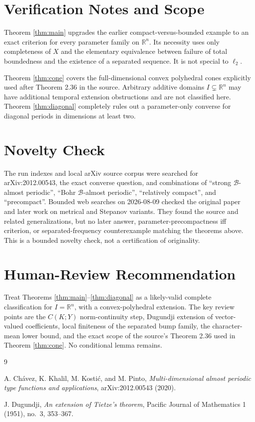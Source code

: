 \documentclass[11pt]{article}
\newcommand{\R}{\mathbb R}
\begin{document}
\section*{Verification Notes and Scope}

Theorem \ref{thm:main} upgrades the earlier compact-versus-bounded example
to an exact criterion for every parameter family on $\R^n$.  Its necessity
uses only completeness of $X$ and the elementary equivalence between failure
of total boundedness and the existence of a separated sequence.  It is not
special to $\ell_2$.

Theorem \ref{thm:cone} covers the full-dimensional convex polyhedral cones
explicitly used after Theorem 2.36 in the source.  Arbitrary additive domains
$I\subsetneq\R^n$ may have additional temporal extension obstructions and are
not classified here.  Theorem \ref{thm:diagonal} completely rules out a
parameter-only converse for diagonal periods in dimensions at least two.

\section*{Novelty Check}

The run indexes and local arXiv source corpus were searched for
arXiv:2012.00543, the exact converse question, and combinations of
``strong $\mathcal B$-almost periodic'', ``Bohr $\mathcal B$-almost
periodic'', ``relatively compact'', and ``precompact''.  Bounded web searches
on 2026-08-09 checked the original paper and later work on metrical and
Stepanov variants.  They found the source and related generalizations, but no
later answer, parameter-precompactness iff criterion, or separated-frequency
counterexample matching the theorems above.  This is a bounded novelty check,
not a certification of originality.

\section*{Human-Review Recommendation}

Treat Theorems \ref{thm:main}--\ref{thm:diagonal} as a likely-valid complete
classification for $I=\R^n$, with a convex-polyhedral extension.  The key
review points are the $C(K;Y)$ norm-continuity step, Dugundji extension of
vector-valued coefficients, local finiteness of the separated bump family,
the character-mean lower bound, and the exact scope of the source's Theorem
2.36 used in Theorem \ref{thm:cone}.  No conditional lemma remains.

\begin{thebibliography}{9}

A. Ch\'avez, K. Khalil, M. Kosti\'c, and M. Pinto,
\emph{Multi-dimensional almost periodic type functions and applications},
arXiv:2012.00543 (2020).

J. Dugundji,
\emph{An extension of Tietze's theorem},
Pacific Journal of Mathematics 1 (1951), no.~3, 353--367.

\end{thebibliography}
\end{document}
